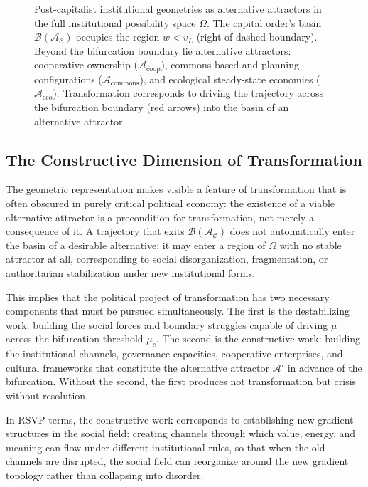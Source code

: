 \documentclass[12pt,a4paper]{article}
\theoremstyle{definition}
\theoremstyle{remark}
\begin{document}
\begin{figure}[ht]
\caption{Post-capitalist institutional geometries as alternative attractors in the full institutional possibility space $\Omega$. The capital order's basin $\mathcal{B}(\mathcal{A}_\mathcal{C})$ occupies the region $w < v_L$ (right of dashed boundary). Beyond the bifurcation boundary lie alternative attractors: cooperative ownership ($\mathcal{A}_{\text{coop}}$), commons-based and planning configurations ($\mathcal{A}_{\text{commons}}$), and ecological steady-state economies ($\mathcal{A}_{\text{eco}}$). Transformation corresponds to driving the trajectory across the bifurcation boundary (red arrows) into the basin of an alternative attractor.}
\label{fig:postcapitalist}
\end{figure}

\subsection{The Constructive Dimension of Transformation}

The geometric representation makes visible a feature of transformation that is often obscured in purely critical political economy: the existence of a viable alternative attractor is a precondition for transformation, not merely a consequence of it. A trajectory that exits $\mathcal{B}(\mathcal{A}_\mathcal{C})$ does not automatically enter the basin of a desirable alternative; it may enter a region of $\Omega$ with no stable attractor at all, corresponding to social disorganization, fragmentation, or authoritarian stabilization under new institutional forms.

This implies that the political project of transformation has two necessary components that must be pursued simultaneously. The first is the destabilizing work: building the social forces and boundary struggles capable of driving $\mu$ across the bifurcation threshold $\mu_c$. The second is the constructive work: building the institutional channels, governance capacities, cooperative enterprises, and cultural frameworks that constitute the alternative attractor $\mathcal{A}'$ in advance of the bifurcation. Without the second, the first produces not transformation but crisis without resolution.

In RSVP terms, the constructive work corresponds to establishing new gradient structures in the social field: creating channels through which value, energy, and meaning can flow under different institutional rules, so that when the old channels are disrupted, the social field can reorganize around the new gradient topology rather than collapsing into disorder.
\end{document}
